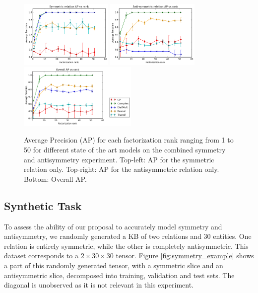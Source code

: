\documentclass{article}
\begin{document}
\begin{figure}{{\extracolsep{8pt}}}%
	\centering
	\includegraphics[width=0.40\textwidth]{symmetric_rel_ap_vs_rank.png}
	\includegraphics[width=0.40\textwidth]{antisymmetric_rel_ap_vs_rank.png} 
	\includegraphics[width=0.51\textwidth]{overall_ap_vs_rank.png}
	\caption{Average Precision (AP) for each factorization rank ranging from 1 to 50 for different state of the art models on the combined symmetry and antisymmetry experiment. Top-left: AP for the symmetric relation only. Top-right: AP for the antisymmetric relation only. Bottom: Overall AP.}
	\label{fig:exp_sym_antisym}
\end{figure}

\subsection{Synthetic Task}

To assess the ability of our proposal to accurately model symmetry and antisymmetry, we randomly generated a KB of two relations and 30 entities. One relation is entirely symmetric, while the other is completely antisymmetric. This dataset corresponds to a $2 \times 30 \times 30$ tensor. Figure \ref{fig:symmetry_example} shows a part of this randomly generated tensor, with a symmetric slice and an antisymmetric slice, decomposed into training, validation and test sets. The diagonal is unobserved as it is not relevant in this experiment.
\end{document}
